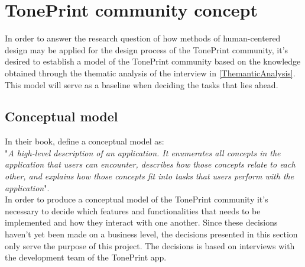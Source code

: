\chapter{TonePrint community concept}
\label{CommunityConcept}
In order to answer the research question of how methods of human-centered design may be applied for the design process of the TonePrint community, it's desired to establish a model of the TonePrint community based on the knowledge obtained through the thematic analysis of the interview in \autoref{ThemanticAnalysis}. This model will serve as a baseline when deciding the tasks that lies ahead.

\section{Conceptual model}
\label{ConceptualModel}
In their book, \textcite{PDF:Henderson2012} define a conceptual model as: \\
"\textit{A high-level description of an application. It enumerates all concepts in the application that users can encounter, describes how those concepts relate to each other, and explains how those concepts fit into tasks that users perform with the application}".\\

\noindent
In order to produce a conceptual model of the TonePrint community it's necessary to decide which features and functionalities that needs to be implemented and how they interact with one another. Since these decisions haven't yet been made on a business level, the decisions presented in this section only serve the purpose of this project. The decisions is based on interviews with the development team of the TonePrint app.


